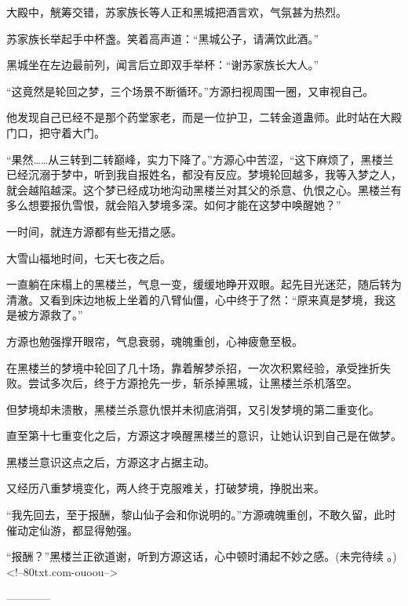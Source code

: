 \begin{this_body}
大殿中，觥筹交错，苏家族长等人正和黑城把酒言欢，气氛甚为热烈。

苏家族长举起手中杯盏。笑着高声道：“黑城公子，请满饮此酒。”

黑城坐在左边最前列，闻言后立即双手举杯：“谢苏家族长大人。”

“这竟然是轮回之梦，三个场景不断循环。”方源扫视周围一圈，又审视自己。

他发现自己已经不是那个药堂家老，而是一位护卫，二转金道蛊师。此时站在大殿门口，把守着大门。

“果然……从三转到二转巅峰，实力下降了。”方源心中苦涩，“这下麻烦了，黑楼兰已经沉溺于梦中，听到我自报姓名，都没有反应。梦境轮回越多，我等入梦之人，就会越陷越深。这个梦已经成功地沟动黑楼兰对其父的杀意、仇恨之心。黑楼兰有多么想要报仇雪恨，就会陷入梦境多深。如何才能在这梦中唤醒她？”

一时间，就连方源都有些无措之感。

大雪山福地时间，七天七夜之后。

一直躺在床榻上的黑楼兰，气息一变，缓缓地睁开双眼。起先目光迷茫，随后转为清澈。又看到床边地板上坐着的八臂仙僵，心中终于了然：“原来真是梦境，我这是被方源救了。”

方源也勉强撑开眼帘，气息衰弱，魂魄重创，心神疲惫至极。

在黑楼兰的梦境中轮回了几十场，靠着解梦杀招，一次次积累经验，承受挫折失败。尝试多次后，终于方源抢先一步，斩杀掉黑城，让黑楼兰杀机落空。

但梦境却未溃散，黑楼兰杀意仇恨并未彻底消弭，又引发梦境的第二重变化。

直至第十七重变化之后，方源这才唤醒黑楼兰的意识，让她认识到自己是在做梦。

黑楼兰意识这点之后，方源这才占据主动。

又经历八重梦境变化，两人终于克服难关，打破梦境，挣脱出来。

“我先回去，至于报酬，黎山仙子会和你说明的。”方源魂魄重创，不敢久留，此时催动定仙游，都显得勉强。

“报酬？”黑楼兰正欲道谢，听到方源这话，心中顿时涌起不妙之感。(未完待续 。)<!--80txt.com-ouoou-->

------------

\end{this_body}

